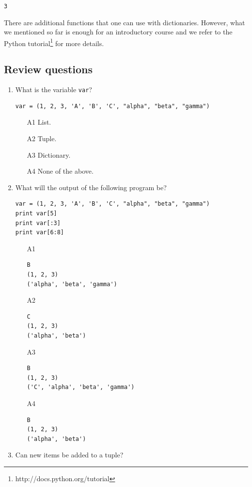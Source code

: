 \begin{verbatim}
3
\end{verbatim}
There are additional functions that one can use with dictionaries. However, 
what we mentioned so far is enough for an introductory course and we refer 
to the Python tutorial\footnote{http://docs.python.org/tutorial} for more 
details.

\subsection{Review questions}

\begin{enumerate}
\item What is the variable {\tt var}?
\begin{verbatim}
var = (1, 2, 3, 'A', 'B', 'C', "alpha", "beta", "gamma")
\end{verbatim}
\begin{enumerate}
\item[A1] List.
\item[A2] Tuple.
\item[A3] Dictionary.
\item[A4] None of the above.
\end{enumerate}
\item What will the output of the following program be?
\begin{verbatim}
var = (1, 2, 3, 'A', 'B', 'C', "alpha", "beta", "gamma")
print var[5]
print var[:3]
print var[6:8]
\end{verbatim}
\begin{enumerate}
\item[A1] 
\begin{verbatim}
B
(1, 2, 3)
('alpha', 'beta', 'gamma')
\end{verbatim}
\item[A2] 
\begin{verbatim}
C
(1, 2, 3)
('alpha', 'beta')
\end{verbatim}
\item[A3] 
\begin{verbatim}
B
(1, 2, 3)
('C', 'alpha', 'beta', 'gamma')
\end{verbatim}
\item[A4]
\begin{verbatim}
B
(1, 2, 3)
('alpha', 'beta')
\end{verbatim}
\end{enumerate}
\item Can new items be added to a tuple?
\begin{enumerate}

\end{enumerate}
\end{enumerate}

